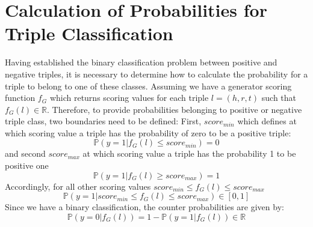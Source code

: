 \section{Calculation of Probabilities for Triple Classification} \label{sec:calculation_of_probabilities_for_triple_classification}
%
Having established the binary classification problem between positive and negative triples, it is necessary to determine how to calculate the probability for a triple to belong to one of these classes.
Assuming we have a generator scoring function $f_G$ which returns scoring values for each triple $l = (h,r,t)$ such that $f_G(l) \in \mathbb{R}$.
Therefore, to provide probabilities belonging to positive or negative triple class, two boundaries need to be defined:
First, $score_{min}$ which defines at which scoring value a triple has the probability of zero to be a positive triple: 
\begin{equation} \label{eqn:prob_score_min}
    \mathds{P}(y = 1 | f_G(l) \leq score_{min}) = 0
\end{equation}
and second $score_{max}$ at which scoring value a triple has the probability 1 to be positive one 
\begin{equation} \label{eqn:prob_score_max}
    \mathds{P}(y = 1 | f_G(l) \geq score_{max}) = 1
\end{equation}
Accordingly, for all other scoring values $score_{min} \leq f_G(l) \leq score_{max}$
\begin{equation} \label{eqn:prob_score_all}
    \mathds{P}(y = 1 | score_{min} \leq f_G(l) \leq score_{max}) \in [0, 1]
\end{equation}
Since we have a binary classification, the counter probabilities are given by:
\begin{equation} \label{eqn:counter_prob}
    \mathds{P}(y = 0 | f_G(l)) = 1 - \mathds{P}(y = 1 | f_G(l)) \in \mathbb{R}
\end{equation}

